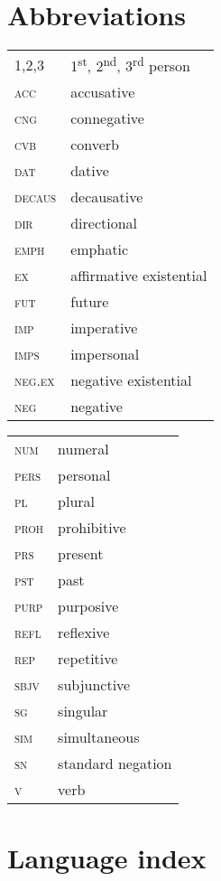 \documentclass[output=paper]{langscibook}
\begin{document}
\section*{Abbreviations}
\begin{tabularx}{.45\textwidth}{lQ}
1,2,3 & 1\textsuperscript{st}, 2\textsuperscript{nd}, 3\textsuperscript{rd} person \\
\textsc{acc} & accusative\\
\textsc{cng} & connegative\\
\textsc{cvb} & converb\\
\textsc{dat} & dative\\
\textsc{decaus} & decausative\\
\textsc{dir} & directional\\
\textsc{emph} & emphatic\\
\textsc{ex} & affirmative existential\\
\textsc{fut} & future\\
\textsc{imp} & imperative\\
\textsc{imps} & impersonal\\
\textsc{neg.ex} & negative existential\\
\textsc{neg} & negative\\
\end{tabularx}
\begin{tabularx}{.45\textwidth}{lQ}
\textsc{num} & numeral\\
\textsc{pers} & personal\\
\textsc{pl} & plural\\
\textsc{proh} & prohibitive\\
\textsc{prs} & present\\
\textsc{pst} & past\\
\textsc{purp} & purposive\\
\textsc{refl} & reflexive\\
\textsc{rep} & repetitive\\
\textsc{sbjv} & subjunctive\\
\textsc{sg} & singular\\
\textsc{sim} & simultaneous\\
\textsc{sn} & standard negation\\
\textsc{v} & verb\\
\end{tabularx}

\section*{Language index}
\end{document}
